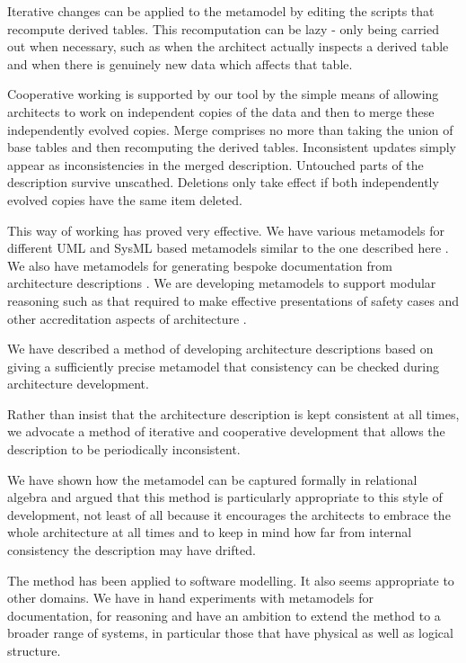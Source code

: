 \documentclass[times, 10pt,twocolumn]{article}
\begin{document}
Iterative changes can be applied to the metamodel by editing the scripts that recompute derived tables. This recomputation can be lazy - only being carried out when necessary, such as when the architect actually inspects a derived table and when there is genuinely new data which affects that table.

Cooperative working is supported by our tool by the simple means of allowing architects to work on independent copies of the data and then to merge these independently evolved copies. Merge comprises no more than taking the union of base tables and then recomputing the derived tables. Inconsistent updates simply appear as inconsistencies in the merged description. Untouched parts of the description survive unscathed. Deletions only take effect if both independently evolved copies have the same item deleted.

This way of working has proved very effective. We have various metamodels for different UML and SysML based metamodels similar to the one described here %
. We also have metamodels for generating bespoke documentation from architecture descriptions \cite{Henderson3}. We are developing metamodels to support modular reasoning such as that required to make effective presentations of safety cases and other accreditation aspects of architecture \cite{Rushby}.

\noindent We have described a method of developing architecture descriptions based on giving a sufficiently precise metamodel that consistency can be checked during architecture development.

Rather than insist that the architecture description is kept consistent at all times, we advocate a method of iterative and cooperative development that allows the description to be periodically inconsistent.

We have shown how the metamodel can be captured formally in relational algebra and argued that this method is particularly appropriate to this style of development, not least of all because it encourages the architects to embrace the whole architecture at all times and to keep in mind how far from internal consistency the description may have drifted.

The method has been applied to software modelling. It also seems appropriate to other domains. We have in hand experiments with metamodels for documentation, for reasoning and have an ambition to extend the method to a broader range of systems, in particular those that have physical as well as logical structure.

\nocite{Shen,Rushby,Chang2}


\end{document}
